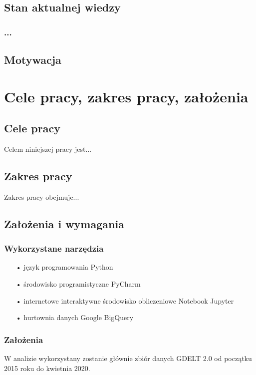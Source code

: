\documentclass[11pt]{report}
\begin{document}
 
 \section{Stan aktualnej wiedzy}
 \subsection{...}
 
 \section{Motywacja}


 \chapter{Cele pracy, zakres pracy, założenia}\label{ch:cele}

 \section{Cele pracy}
 Celem niniejszej pracy jest...

 \section{Zakres pracy}
 Zakres pracy obejmuje...
 
 
 \section{Założenia i wymagania}
 
 \subsection{Wykorzystane narzędzia}
 \begin{enumerate}
 \item[•] język programowania Python
 \item[•] środowisko programistyczne PyCharm 
 \item[•] internetowe interaktywne środowisko obliczeniowe Notebook Jupyter
 \item[•] hurtownia danych Google BigQuery
 \end{enumerate}
 
 \subsection{Założenia}
 W analizie wykorzystany zostanie głównie zbiór danych GDELT 2.0 od początku 2015 roku do kwietnia 2020.
 
\end{document}

